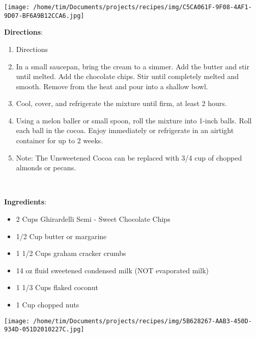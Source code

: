 \documentclass[11pt, twoside, openany]{book}
\begin{document}
\begin{minipage}[t]{0.2\linewidth}
\centering \strut\vspace*{-\baselineskip}\newline
\texttt{[image: /home/tim/Documents/projects/recipes/img/C5CA061F-9F08-4AF1-9D07-BF6A9B12CCA6.jpg]}\\
\end{minipage}\vspace{3mm}
\textbf{Directions}:
\vspace{-3mm}\begin{enumerate}\setlength\itemsep{-1mm}
\item Directions
\item In a small saucepan, bring the cream to a simmer. Add the butter and stir until melted. Add the chocolate chips. Stir until completely melted and smooth. Remove from the heat and pour into a shallow bowl.
\item Cool, cover, and refrigerate the mixture until firm, at least 2 hours.
\item Using a melon baller or small spoon, roll the mixture into 1-inch balls. Roll each ball in the cocoa. Enjoy immediately or refrigerate in an airtight container for up to 2 weeks.
\item Note: The Unsweetened Cocoa can be replaced with 3/4 cup of chopped almonds or pecans.
\end{enumerate}
 \label{magic-cookie-bars}\hfill\textit{}\\
\begin{minipage}[t]{0.8\linewidth}
\textbf{Ingredients}:\vspace{-3mm}
\begin{multicols}{2}
\begin{itemize}\setlength\itemsep{-1mm}
\item 2 Cups Ghirardelli Semi - Sweet Chocolate Chips
\item 1/2 Cup butter or margarine
\item 1 1/2 Cups graham cracker crumbs
\item 14 oz fluid sweetened condensed milk (NOT evaporated milk)
\item 1 1/3 Cups flaked coconut
\item 1 Cup chopped nuts
\end{itemize}
\end{multicols}
\end{minipage}
\begin{minipage}[t]{0.2\linewidth}
\centering \strut\vspace*{-\baselineskip}\newline
\texttt{[image: /home/tim/Documents/projects/recipes/img/5B628267-AAB3-450D-934D-051D2010227C.jpg]}\\
\end{minipage}\vspace{3mm}
\end{document}
